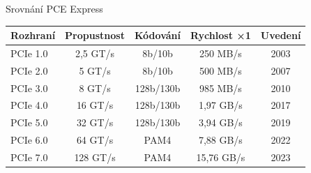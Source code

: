 \documentclass[aspectratio=43]{beamer}
\begin{document}
\begin{frame}{Srovnání PCE Express}
	\begin{table}[]
        \begin{tabular}{|l|c|c|c|c|}
        \hline
        \textbf{Rozhraní} & \textbf{Propustnost} & \textbf{Kódování} & \textbf{Rychlost ×1} & \textbf{Uvedení} \\ \hline
        PCIe 1.0 & 2,5 GT/s & 8b/10b    & 250 MB/s  & 2003 \\ \hline
        PCIe 2.0 & 5 GT/s   & 8b/10b    & 500 MB/s  & 2007 \\ \hline
        PCIe 3.0 & 8 GT/s   & 128b/130b & 985 MB/s  & 2010 \\ \hline
        PCIe 4.0 & 16 GT/s  & 128b/130b & 1,97 GB/s & 2017 \\ \hline
        PCIe 5.0 & 32 GT/s  & 128b/130b & 3,94 GB/s & 2019 \\ \hline
        PCIe 6.0 & 64 GT/s  & PAM4      & 7,88 GB/s & 2022 \\ \hline
        PCIe 7.0 & 128 GT/s & PAM4 & 15,76 GB/s & 2023 \\ \hline
        \end{tabular}
    \end{table}
	
\end{frame}
\end{document}
